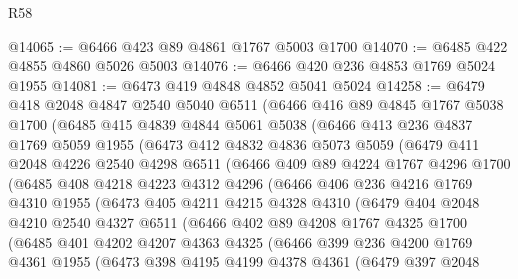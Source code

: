 \begin{lexlean}{R58}
\begin{coremodule}
@14065 := @6466 @423 @89 @4861 @1767 @5003 @1700
@14070 := @6485 @422 @4855 @4860 @5026 @5003
@14076 := @6466 @420 @236 @4853 @1769 @5024 @1955
@14081 := @6473 @419 @4848 @4852 @5041 @5024
@14258 := @6479
    @418
    @2048
    @4847
    @2540
    @5040
    @6511
    (@6466
      @416
      @89
      @4845
      @1767
      @5038
      @1700
      (@6485
        @415
        @4839
        @4844
        @5061
        @5038
        (@6466
          @413
          @236
          @4837
          @1769
          @5059
          @1955
          (@6473
            @412
            @4832
            @4836
            @5073
            @5059
            (@6479
              @411
              @2048
              @4226
              @2540
              @4298
              @6511
              (@6466
                @409
                @89
                @4224
                @1767
                @4296
                @1700
                (@6485
                  @408
                  @4218
                  @4223
                  @4312
                  @4296
                  (@6466
                    @406
                    @236
                    @4216
                    @1769
                    @4310
                    @1955
                    (@6473
                      @405
                      @4211
                      @4215
                      @4328
                      @4310
                      (@6479
                        @404
                        @2048
                        @4210
                        @2540
                        @4327
                        @6511
                        (@6466
                          @402
                          @89
                          @4208
                          @1767
                          @4325
                          @1700
                          (@6485
                            @401
                            @4202
                            @4207
                            @4363
                            @4325
                            (@6466
                              @399
                              @236
                              @4200
                              @1769
                              @4361
                              @1955
                              (@6473
                                @398
                                @4195
                                @4199
                                @4378
                                @4361
                                (@6479
                                  @397
                                  @2048

\end{coremodule}
\end{lexlean}
